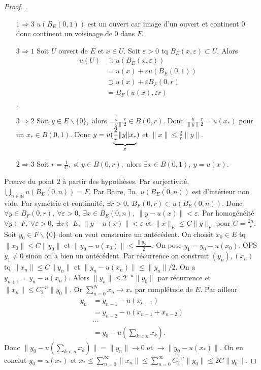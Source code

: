 \begin{proof}.
\begin{itemize}
    \item[$1\Rightarrow 3$] $u(B_E(0,1))$ est un ouvert car image d'un ouvert et continent 0 donc continent un voisinage de 0 dans $F$.
    \item[$3\Rightarrow 1$] Soit $U$ ouvert de $E$ et $x\in U.$ Soit $\varepsilon >0$ tq $B_E(x,\varepsilon )\subset U.$ Alors 
    \begin{align*}
        u(U) &\supset u(B_E(x,\varepsilon ))\\
        &=u(x)+\varepsilon u(B_E(0,1))\\
        &\supset u(x)+\varepsilon B_F(0,r)\\
        &=B_F(u(x),\varepsilon r)
    \end{align*}.
    \item[$3\Rightarrow 2$] Soit $y\in E\backslash \{0\} ,$ alors $\frac{y}{\|y\|}\frac{r}{2}\in B(0,r).$ Donc $\frac{y}{\|y\|}\frac{r}{2}=u(x_*)$ pour un $x_*\in B(0,1).$ Donc $y=u(\underbrace{\frac{2}{r}\|y\|x_*}_{\mathclap{x}})$ et $\|x\|\le \frac{2}{r}\|y\|.$
    \item[$2\Rightarrow 3$] Soit $r=\frac{1}{C},$ si $y\in B(0,r),$ alors $\exists x\in B(0,1),\ y=u(x).$
\end{itemize}
Preuve du point 2 à partir des hypothèses. Par surjectivité,
${\bigcup\limits_{n\in \mathbb{N}} \overline{u(B_E(0,n))}=F.}$ Par Baire, $\exists n,\ \overline{u(B_E(0,n))}$ est d'intérieur non vide. Par symétrie et continuité, $\exists r>0,\ B_F(0,r)\subset \overline{u(B_E(0,n))}.$ Donc $\forall y\in B_F(0,r),\ \forall \varepsilon >0,\ \exists x\in B_E(0,n),\ \|y-u(x)\|<\varepsilon .$ Par homogénéité $\forall y\in  F,\ \forall \varepsilon >0,\ \exists x\in E,\ \|y-u(x)\|<\varepsilon $ et $\|x\|_E\le C\|y\|_F$ pour $C=\frac{2n}{r}$.\\
Soit $y_0\in F\backslash \{0\} $ dont on veut construire un antécédent. On choisit $x_0\in E$ tq $\|x_0\|\le C\|y_0\|$ et $\|y_0-u(x_0)\|\le \frac{\|y_0\|}{2}.$ On pose $y_1=y_0-u(x_0).$ OPS $y_1\neq 0$ sinon on a bien un antécédent. Par récurrence on construit $(y_n),(x_n)$ tq $\|x_n\|\le C\|y_n\|$ et $\|y_n-u(x_n)\|\le \|y_n\|/2.$ On a $y_{n+1}=y_n-u(x_n).$ Alors $\|y_n\|\le 2^{-n}\|y_0\|$ par récurrence et $\|x_n\|\le C_2^{-n}\|y_0\|.$ Or $\sum\limits_{n=0}^{N} x_n\to x_*$ par complétude de $E.$ Par ailleur
\begin{align*}
    y_n&=y_{n-1}-u(x_{n-1})\\
       &=y_{n-2}-u(x_{n-1}+x_{n-2})\\
       &\cdots\\
       &=y_0-u(\sum\limits_{k<n}^{} x_k).
\end{align*}
Donc $\|y_0-u(\sum\limits_{k<n}^{} x_k)\|=\|y_n\|\to 0$ et $\to \|y_0-u(x_*)\|$. On en conclut $y_0=u(x_*)$ et $x_*\le \sum\limits_{n=0}^{\infty} \|x_n\|\le \sum\limits_{n=0}^{\infty} C_2^{-n}\|y_0\|\le 2C\|y_0\|.$
\end{proof}

